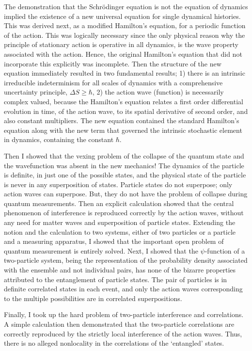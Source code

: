 The demonstration that the Schrödinger equation is not the equation of dynamics implied
the existence of a new universal equation for single dynamical histories. This was derived
next, as a modified Hamilton's equation, for a periodic function of the action. This was
logically necessary since the only physical reason why the principle of stationary action
is operative in all dynamics, is the wave property associated with the action. Hence, the
original Hamilton's equation that did not incorporate this explicitly was incomplete. Then
the structure of the new equation immediately resulted in two fundamental results; 1) there
is an intrinsic irreducible indeterminism for all scales of dynamics with a comprehensive
uncertainty principle, $\Delta S \geq  \hbar$, 2) the action wave (function) is necessarily complex valued,
because the Hamilton's equation relates a first order differential evolution in time, of the
action wave, to its spatial derivative of second order, and also constant multipliers. The
new equation contained the standard Hamilton's equation along with the new term that
governed the intrinsic stochastic element in dynamics, containing the constant $\hbar$.

Then I showed that the vexing problem of the collapse of the quantum state and the
wavefunction was absent in the new mechanics! The dynamics of the particle is definite, in
just one of the possible states, and the physical state of the particle is never in any superposition of states. Particle states do not superpose; only action waves can superpose. But, they do not have the problem of collapse during quantum measurements. Then an explicit
calculation showed that the central phenomenon of interference is reproduced correctly by
the action waves, without any need for matter waves and superposition of particle states.
Extending the notion and the calculation to two systems, either of two particles or a particle and a measuring apparatus, I showed that the important open problem of quantum
measurement is entirely solved. Next, I showed that the $\psi$-function of a two-particle system, being the representation of the probability density associated with the ensemble and not individual pairs, has none of the bizarre properties attributed to the entanglement of
particle states. The pair of particles is in definite correlated states in each event, and only
the action waves corresponding to the multiple possibilities are in correlated superpositions.

Finally, I took up the hard problem of two-particle interference and correlations. A simple
calculation then demonstrated that the two-particle correlations are correctly reproduced by
the strictly local interference of the action waves. Thus, there is no alleged nonlocality in
the correlations of the `entangled' states.

